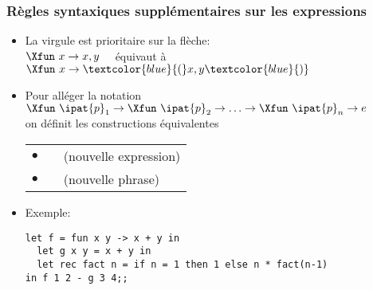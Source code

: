 %
\begin{frame}[containsverbatim]
\frametitle{Règles syntaxiques supplémentaires sur les expressions}

\begin{itemize}

  \item La virgule est prioritaire sur la flèche:\\
        $\Xfun \,\, x \rightarrow x, y$ \ \ équivaut à \ \ 
        $\Xfun \,\, x \rightarrow \textcolor{blue}{(}x,y\textcolor{blue}{)}$

  \item Pour alléger la notation $\Xfun \,\, \ipat{p}_1 \rightarrow
  \Xfun \,\, \ipat{p}_2 \rightarrow \ldots \rightarrow \Xfun \,\,
  \ipat{p}_n \rightarrow e$\\
  on définit les constructions équivalentes

        \begin{tabular}{rll}
            $\bullet$
          & \phrase{$\Xlet \,\,
            \textrm{[}\Xrec\textrm{]} \,\, f 
            = \Xfun \,\, \ipat{p}_1 \, \ipat{p}_2 \, \textcolor{blue}{\ldots
            \, \ipat{p}_n} \rightarrow e$}
          & (nouvelle expression)\\
            $\bullet$
          & \phrase{$\Xlet \,\,
            \textrm{[}\Xrec\textrm{]} \,\, f 
            \,\, \ipat{p}_1 \, \ipat{p}_2 \, \textcolor{blue}{\ldots \,
            \ipat{p}_n} = e$}
          & (nouvelle phrase)
        \end{tabular}

  \item Exemple:
  {\small
   \begin{verbatim}
let f = fun x y -> x + y in
  let g x y = x + y in
  let rec fact n = if n = 1 then 1 else n * fact(n-1)
in f 1 2 - g 3 4;;
  \end{verbatim}
  }
  
\end{itemize}

\end{frame}


